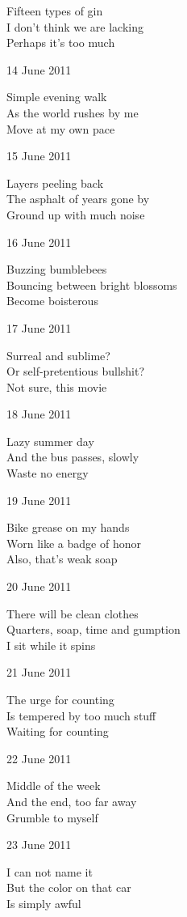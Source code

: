\documentclass[12pt]{article}
\begin{document}
Fifteen types of gin \\
I don't think we are lacking \\
Perhaps it's too much

14 June 2011

Simple evening walk \\
As the world rushes by me \\
Move at my own pace

15 June 2011

Layers peeling back \\
The asphalt of years gone by \\
Ground up with much noise

16 June 2011

Buzzing bumblebees \\
Bouncing between bright blossoms \\
Become boisterous

\newpage

17 June 2011

Surreal and sublime? \\
Or self-pretentious bullshit? \\
Not sure, this movie

18 June 2011

Lazy summer day \\
And the bus passes, slowly \\
Waste no energy

19 June 2011

Bike grease on my hands \\
Worn like a badge of honor \\
Also, that's weak soap

20 June 2011

There will be clean clothes \\
Quarters, soap, time and gumption \\
I sit while it spins

21 June 2011

The urge for counting \\
Is tempered by too much stuff \\
Waiting for counting

22 June 2011

Middle of the week \\
And the end, too far away \\
Grumble to myself

23 June 2011

I can not name it \\
But the color on that car \\
Is simply awful
\end{document}
